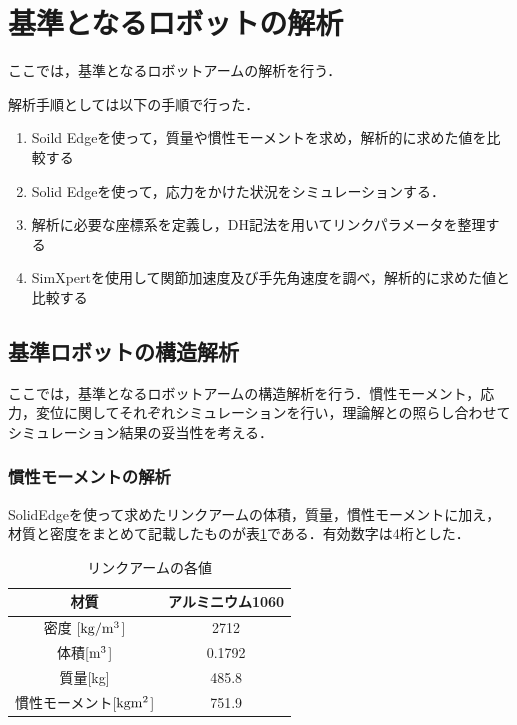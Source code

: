 \section{基準となるロボットの解析}\label{ux57faux6e96ux3068ux306aux308bux30edux30dcux30c3ux30c8ux306eux89e3ux6790}

ここでは，基準となるロボットアームの解析を行う．

解析手順としては以下の手順で行った．

\begin{enumerate}
\def\labelenumi{\arabic{enumi}.}
\item
  Soild
  Edgeを使って，質量や慣性モーメントを求め，解析的に求めた値を比較する
\item
  Solid Edgeを使って，応力をかけた状況をシミュレーションする．
\item
  解析に必要な座標系を定義し，DH記法を用いてリンクパラメータを整理する
\item
  SimXpertを使用して関節加速度及び手先角速度を調べ，解析的に求めた値と比較する
\end{enumerate}

\subsection{基準ロボットの構造解析}\label{ux57faux6e96ux30edux30dcux30c3ux30c8ux306eux69cbux9020ux89e3ux6790}

ここでは，基準となるロボットアームの構造解析を行う．慣性モーメント，応力，変位に関してそれぞれシミュレーションを行い，理論解との照らし合わせてシミュレーション結果の妥当性を考える．

\subsubsection{慣性モーメントの解析}\label{ux6163ux6027ux30e2ux30fcux30e1ux30f3ux30c8ux306eux89e3ux6790}

SolidEdgeを使って求めたリンクアームの体積，質量，慣性モーメントに加え，材質と密度をまとめて記載したものが表\ref{basis-robot-data}である．有効数字は4桁とした．

\begin{table}[htb]
\caption[]{リンクアームの各値}
  \begin{center}
    \begin{tabular}{|c|c|} \hline
      材質 & アルミニウム1060 \\ \hline
      密度 [$\rm kg/m^3$]& 2712 \\ \hline
      体積[$\rm m^3$] & 0.1792 \\ \hline
      質量[kg] & 485.8 \\ \hline
      慣性モーメント[$\rm kg m^2$] & 751.9  \\ \hline
    \end{tabular}
    \label{basis-robot-data}
  \end{center}
\end{table}

